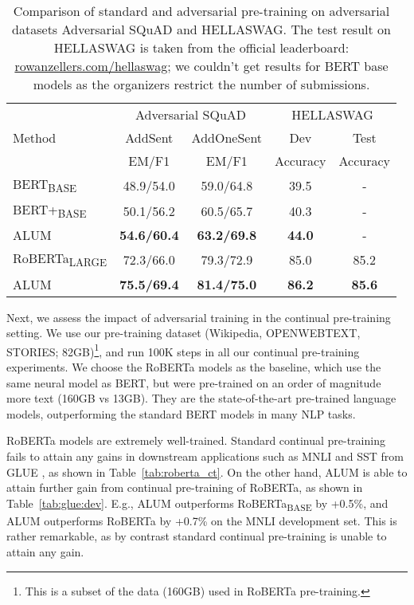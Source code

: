 \documentclass[11pt,a4paper]{article}
\newcommand\DNAME{ALUM}
\newcommand{\robertalarge}{RoBERTa}
\newcommand{\alumbert}{ALUM}
\newcommand{\alumrobertabase}{ALUM}
\newcommand{\alumrobertalarge}{ALUM}
\begin{document}
\begin{table*}[htb!]
    \centering
    \begin{tabular}{l|c|c||c|c}
    \hline
\toprule    
         \multirow{3}{*}{Method} & 
         \multicolumn{2}{c||}{Adversarial SQuAD} & \multicolumn{2}{c}{HELLASWAG}  \\
         \cline{2-5}
          & AddSent & AddOneSent  &  Dev & Test \\ \cline{2-5}
          &EM/F1&EM/F1 & Accuracy &Accuracy\\ \hline
          BERT\textsubscript{BASE} &  48.9/54.0	&59.0/64.8 & 39.5 & -\\
          BERT+\textsubscript{BASE} & 50.1/56.2 	&60.5/65.7 & 40.3 & -\\
          \alumbert{} &  \textbf{54.6/60.4} &	\textbf{63.2/69.8} &\textbf{44.0} & -\\ \hline \hline
           RoBERTa\textsubscript{LARGE} &	72.3/66.0&79.3/72.9 & 85.0 &85.2 \\
          \alumrobertalarge{}&\textbf{75.5/69.4}&	\textbf{81.4/75.0}	&\textbf{86.2}& \textbf{85.6}\\ 
\bottomrule
    \end{tabular}
    \caption{Comparison of standard and adversarial pre-training on adversarial datasets Adversarial SQuAD and HELLASWAG. The test result on HELLASWAG is taken from the official leaderboard: \hyperlink{ rowanzellers.com/hellaswag}{rowanzellers.com/hellaswag}; we couldn't get results for BERT base models as the organizers restrict the number of submissions.}
    \label{tab:squad}    
\end{table*}

Next, we assess the impact of adversarial training in the continual pre-training setting. 
We use our pre-training dataset (Wikipedia, OPENWEBTEXT, STORIES; 82GB)\footnote{This is a subset of the data (160GB) used in RoBERTa pre-training.}, and run 100K steps in all our continual pre-training experiments.
We choose the RoBERTa models as the baseline, which use the same neural model as BERT, but were pre-trained on an order of magnitude more text (160GB vs 13GB). They are the state-of-the-art pre-trained language models, outperforming the standard BERT models in many NLP tasks.

RoBERTa models are extremely well-trained. Standard continual pre-training fails to attain any gains in downstream applications such as MNLI \cite{mnli2018} and SST \cite{sst2013} from GLUE \cite{wang2018glue}, as shown in Table~\ref{tab:roberta_ct}. 
On the other hand, {\DNAME} is able to attain further gain from continual pre-training of RoBERTa, as shown in Table~\ref{tab:glue:dev}. E.g., {\alumrobertabase{}} outperforms RoBERTa\textsubscript{BASE} by +0.5\%, and {{\alumrobertalarge{}}} outperforms \robertalarge{} by +0.7\% on the MNLI development set. This is rather remarkable, as by contrast standard continual pre-training is unable to attain any gain.
\end{document}
